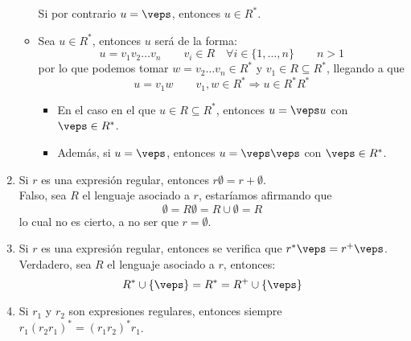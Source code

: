 \begin{enumerate}
\begin{itemize}
                Si por contrario $u = \veps$, entonces $u\in R^\ast$.
            \item Sea $u\in R^\ast$, entonces $u$ será de la forma:
                \begin{equation*}
                    u = v_1v_2\ldots v_n \qquad v_i \in R \quad \forall i \in \{1,\ldots, n\} \qquad n > 1
                \end{equation*}
                por lo que podemos tomar $w = v_2\ldots v_n \in R^\ast$ y $v_1\in R \subseteq R^\ast$, llegando a que
                \begin{equation*}
                    u = v_1w \qquad v_1,w \in R^\ast \Longrightarrow u\in R^\ast R^\ast
                \end{equation*}
                \begin{itemize}
                    \item En el caso en el que $u\in R\subseteq R^\ast$, entonces $u = \veps u$ con $\veps \in R^\ast$.
                    \item Además, si $u = \veps$, entonces $u = \veps \veps$ con $\veps \in R^\ast$.
                \end{itemize}
        \end{itemize}
    \item Si $r$ es una expresión regular, entonces $r\emptyset =r+\emptyset $.\\

        Falso, sea $R$ el lenguaje asociado a $r$, estaríamos afirmando que
        \begin{equation*}
            \emptyset  = R\emptyset  = R \cup \emptyset  = R
        \end{equation*}
        lo cual no es cierto, a no ser que $r = \emptyset $.
    \item Si $r$ es una expresión regular, entonces se verifica que $r^\ast\veps =r^+\veps$.\\

        Verdadero, sea $R$ el lenguaje asociado a $r$, entonces:
        \begin{equation*}
            R^\ast \cup \{\veps\} = R^\ast = R^+ \cup \{\veps\}
        \end{equation*}
    \item Si $r_1$ y $r_2$ son expresiones regulares, entonces siempre $r_1{(r_2r_1)}^{\ast}={(r_1r_2)}^{\ast}r_1$.\\


\end{enumerate}
